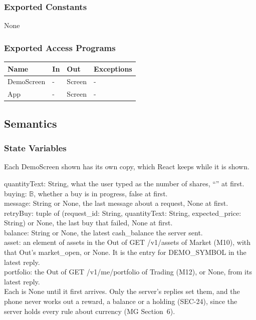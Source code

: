 \documentclass[12pt, titlepage]{article}
\begin{document}
\subsubsection{Exported Constants}

None

\subsubsection{Exported Access Programs}

\begin{center}
\begin{tabular}{p{3cm} p{2cm} p{3cm} p{3cm}}
\toprule
\textbf{Name} & \textbf{In} & \textbf{Out} & \textbf{Exceptions} \\
\midrule
DemoScreen & - & Screen & - \\
App & - & Screen & - \\
\bottomrule
\end{tabular}
\end{center}

\subsection{Semantics}

\subsubsection{State Variables}

\noindent Each DemoScreen shown has its own copy, which React keeps while it
is shown.

\medskip
{\raggedright
\noindent quantityText: String, what the user typed as the number of shares,
``'' at first.\\
buying: $\mathbb{B}$, whether a buy is in progress, false at first.\\
message: String or None, the last message about a request, None at first.\\
retryBuy: tuple of (request\_id: String, quantityText: String,
expected\_price: String) or None, the last buy that failed, None at first.\\
balance: String or None, the latest cash\_balance the server sent.\\
asset: an element of assets in the Out of GET /v1/assets of Market (M10),
with that Out's market\_open, or None. It is the entry for DEMO\_SYMBOL in the
latest reply.\\
portfolio: the Out of GET /v1/me/portfolio of Trading (M12), or None, from
its latest reply.\\
Each is None until it first arrives. Only the server's
replies set them, and the phone never works out a reward, a balance or a
holding (SEC-24), since the server holds every rule about currency (MG
Section~6).\par}
\end{document}
